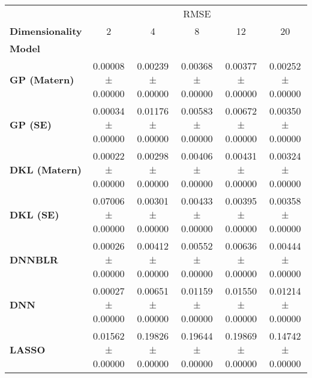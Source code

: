 \begin{tabular}{lccccc}
\toprule
{} & \multicolumn{5}{c}{RMSE} \\
\textbf{Dimensionality} &                 2  &                 4  &                 8  &                 12 &                 20 \\
\textbf{Model       } &                    &                    &                    &                    &                    \\
\midrule
\textbf{GP (Matern) } &  0.00008 ± 0.00000 &  0.00239 ± 0.00000 &  0.00368 ± 0.00000 &  0.00377 ± 0.00000 &  0.00252 ± 0.00000 \\
\textbf{GP (SE)     } &  0.00034 ± 0.00000 &  0.01176 ± 0.00000 &  0.00583 ± 0.00000 &  0.00672 ± 0.00000 &  0.00350 ± 0.00000 \\
\textbf{DKL (Matern)} &  0.00022 ± 0.00000 &  0.00298 ± 0.00000 &  0.00406 ± 0.00000 &  0.00431 ± 0.00000 &  0.00324 ± 0.00000 \\
\textbf{DKL (SE)    } &  0.07006 ± 0.00000 &  0.00301 ± 0.00000 &  0.00433 ± 0.00000 &  0.00395 ± 0.00000 &  0.00358 ± 0.00000 \\
\textbf{DNNBLR      } &  0.00026 ± 0.00000 &  0.00412 ± 0.00000 &  0.00552 ± 0.00000 &  0.00636 ± 0.00000 &  0.00444 ± 0.00000 \\
\textbf{DNN         } &  0.00027 ± 0.00000 &  0.00651 ± 0.00000 &  0.01159 ± 0.00000 &  0.01550 ± 0.00000 &  0.01214 ± 0.00000 \\
\textbf{LASSO       } &  0.01562 ± 0.00000 &  0.19826 ± 0.00000 &  0.19644 ± 0.00000 &  0.19869 ± 0.00000 &  0.14742 ± 0.00000 \\
\bottomrule
\end{tabular}

